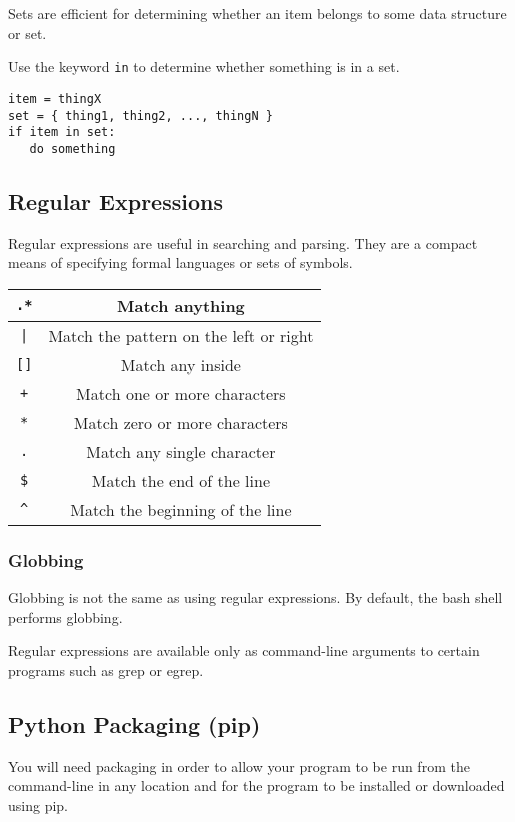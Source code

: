 \documentclass{article}
\begin{document}
Sets are efficient for determining whether
an item belongs to some data structure or set.

Use the keyword \texttt{in} to determine whether something is in a set.
\begin{verbatim}
item = thingX
set = { thing1, thing2, ..., thingN }
if item in set:
   do something
\end{verbatim}

\subsection{Regular Expressions}

Regular expressions are useful in searching 
and parsing. They are a compact means of specifying
formal languages or sets of symbols. 

\begin{tabular}{|c|c|}
\hline \texttt{.*} & Match anything \\
\hline \texttt{|} & Match the pattern on the left or right \\
\hline \texttt{[]} & Match any inside \\
\hline \texttt{+} & Match one or more characters \\
\hline \texttt{*} & Match zero or more characters \\
\hline \texttt{.} & Match any single character \\
\hline \texttt{\$} & Match the end of the line \\
\hline \texttt{\^} & Match the beginning of the line \\
\hline 
\end{tabular}


\subsubsection{Globbing}

Globbing is not the same as using regular expressions.
By default, the bash shell performs globbing.

Regular expressions are available only as command-line
arguments to certain programs such as grep or egrep.

\subsection{Python Packaging (pip)}

You will need packaging in order to allow your program to
be run from the command-line in any location and for 
the program to be installed or downloaded using pip.
\end{document}
